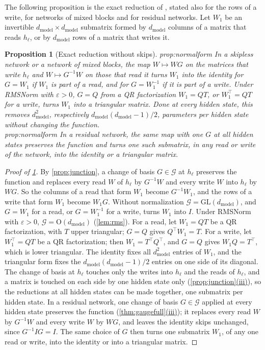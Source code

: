 \documentclass[10pt]{article}
\newtheorem{proposition}[theorem]{Proposition}
\theoremstyle{definition}
\theoremstyle{remark}
\newcommand{\dm}{d_{\mathrm{model}}}
\newcommand{\GL}{\mathrm{GL}}
\newcommand{\Ort}{\mathrm{O}}
\newcommand{\G}{\mathcal{G}}
\newcommand{\ptlabel}[1]{\phantomsection\label{#1}}
\DeclareRobustCommand{\cpref}[2]{\hyperref[#1:#2]{\cref*{#1}(#2)}}
\newcommand{\stpart}[3]{\ifx\relax#1\relax\else\ptlabel{#1:#2}\fi{\upshape\bfseries\boldmath(#2)\ifx\relax#3\relax\else\ #3.\fi}}
\newcommand{\KDreduce}{3.3}   %
\begin{document}
The following proposition is the exact reduction of \citet[Proposition~\KDreduce]{karbevski2026dimension}, stated also for the rows of a write, for networks of mixed blocks and for residual networks. Let $W_1$ be an invertible $\dm \times \dm$ submatrix formed by $\dm$ columns of a matrix that reads $h_\ell$, or by $\dm$ rows of a matrix that writes it.
\begin{proposition}[Exact reduction without skips]\label{prop:normalform}
\stpart{prop:normalform}{i}{} In a skipless network or a network of mixed blocks, the map $W \mapsto WG$ on the matrices that write $h_\ell$ and $W \mapsto G^{-1}W$ on those that read it turns $W_1$ into the identity for $G = W_1$ if $W_1$ is part of a read, and for $G = W_1^{-1}$ if it is part of a write. Under RMSNorm with $\varepsilon > 0$, $G = Q$ from a QR factorization $W_1 = QT$, or $W_1^\top = QT$ for a write, turns $W_1$ into a triangular matrix. Done at every hidden state, this removes $\dm^2$, respectively $\dm(\dm-1)/2$, parameters per hidden state without changing the function.\\
\stpart{prop:normalform}{ii}{} In a residual network, the same map with one $G$ at all hidden states preserves the function and turns one such submatrix, in any read or write of the network, into the identity or a triangular matrix.
\end{proposition}

\begin{proof}[Proof of \cref{prop:normalform}]
By \cref{prop:junction}, a change of basis $G \in \G$ at $h_\ell$ preserves the function and replaces every read $W$ of $h_\ell$ by $G^{-1}W$ and every write $W$ into $h_\ell$ by $WG$. So the columns of a read that form $W_1$ become $G^{-1}W_1$, and the rows of a write that form $W_1$ become $W_1G$. Without normalization $\G = \GL(\dm)$, and $G = W_1$ for a read, or $G = W_1^{-1}$ for a write, turns $W_1$ into $I$. Under RMSNorm with $\varepsilon > 0$, $\G = \Ort(\dm)$ (\cref{lem:rms}). For a read, let $W_1 = QT$ be a QR factorization, with $T$ upper triangular; $G = Q$ gives $Q^\top W_1 = T$. For a write, let $W_1^\top = QT$ be a QR factorization; then $W_1 = T^\top Q^\top$, and $G = Q$ gives $W_1Q = T^\top$, which is lower triangular. The identity fixes all $\dm^2$ entries of $W_1$, and the triangular form fixes the $\dm(\dm-1)/2$ entries on one side of its diagonal. The change of basis at $h_\ell$ touches only the writes into $h_\ell$ and the reads of $h_\ell$, and a matrix is touched on each side by one hidden state only (\cpref{prop:junction}{iii}), so the reductions at all hidden states can be made together, one submatrix per hidden state. In a residual network, one change of basis $G \in \G$ applied at every hidden state preserves the function (\cpref{thm:gaugefull}{iii}); it replaces every read $W$ by $G^{-1}W$ and every write $W$ by $WG$, and leaves the identity skips unchanged, since $G^{-1}IG = I$. The same choice of $G$ then turns one submatrix $W_1$, of any one read or write, into the identity or into a triangular matrix.
\end{proof}
\end{document}

